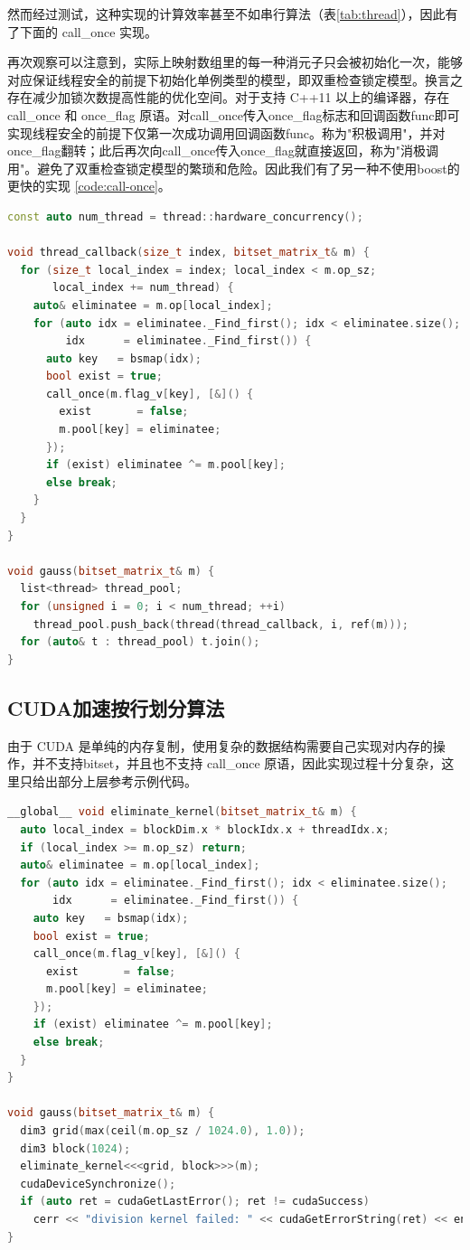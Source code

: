 \documentclass[a4paper]{article}
\begin{document}
然而经过测试，这种实现的计算效率甚至不如串行算法（表\ref{tab:thread}），因此有了下面的 call\_once 实现。

再次观察可以注意到，实际上映射数组里的每一种消元子只会被初始化一次，能够对应保证线程安全的前提下初始化单例类型的模型，即双重检查锁定模型。换言之存在减少加锁次数提高性能的优化空间。对于支持 C++11 以上的编译器，存在 call\_once 和 once\_flag 原语。对call\_once传入once\_flag标志和回调函数func即可实现线程安全的前提下仅第一次成功调用回调函数func。称为"积极调用"，并对once\_flag翻转；此后再次向call\_once传入once\_flag就直接返回，称为"消极调用"。避免了双重检查锁定模型的繁琐和危险。因此我们有了另一种不使用boost的更快的实现 \ref{code:call-once}。

\begin{lstlisting}[frame=trbl, language={C++}, caption={call\_once 位元矩阵消元部分}, label={code:call-once}]
const auto num_thread = thread::hardware_concurrency();

void thread_callback(size_t index, bitset_matrix_t& m) {
  for (size_t local_index = index; local_index < m.op_sz;
       local_index += num_thread) {
    auto& eliminatee = m.op[local_index];
    for (auto idx = eliminatee._Find_first(); idx < eliminatee.size();
         idx      = eliminatee._Find_first()) {
      auto key   = bsmap(idx);
      bool exist = true;
      call_once(m.flag_v[key], [&]() {
        exist       = false;
        m.pool[key] = eliminatee;
      });
      if (exist) eliminatee ^= m.pool[key];
      else break;
    }
  }
}

void gauss(bitset_matrix_t& m) {
  list<thread> thread_pool;
  for (unsigned i = 0; i < num_thread; ++i)
    thread_pool.push_back(thread(thread_callback, i, ref(m)));
  for (auto& t : thread_pool) t.join();
}
\end{lstlisting}

\subsection{CUDA加速按行划分算法}
由于 CUDA 是单纯的内存复制，使用复杂的数据结构需要自己实现对内存的操作，并不支持bitset，并且也不支持 call\_once 原语，因此实现过程十分复杂，这里只给出部分上层参考示例代码。
\begin{lstlisting}[frame=trbl, language={C++}, caption={call\_once 位元矩阵消元部分}, label={code:cuda-row}]
__global__ void eliminate_kernel(bitset_matrix_t& m) {
  auto local_index = blockDim.x * blockIdx.x + threadIdx.x;
  if (local_index >= m.op_sz) return;
  auto& eliminatee = m.op[local_index];
  for (auto idx = eliminatee._Find_first(); idx < eliminatee.size();
       idx      = eliminatee._Find_first()) {
    auto key   = bsmap(idx);
    bool exist = true;
    call_once(m.flag_v[key], [&]() {
      exist       = false;
      m.pool[key] = eliminatee;
    });
    if (exist) eliminatee ^= m.pool[key];
    else break;
  }
}

void gauss(bitset_matrix_t& m) {
  dim3 grid(max(ceil(m.op_sz / 1024.0), 1.0));
  dim3 block(1024);
  eliminate_kernel<<<grid, block>>>(m);
  cudaDeviceSynchronize();
  if (auto ret = cudaGetLastError(); ret != cudaSuccess)
    cerr << "division kernel failed: " << cudaGetErrorString(ret) << endl;
}
\end{lstlisting}
\end{document}
